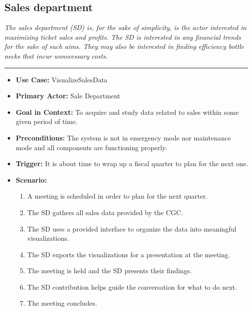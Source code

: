 \documentclass[12pt]{article}
\begin{document}
    \subsection{Sales department}
    \textit{The sales department (SD) is, for the sake of simplicity, is the actor interested 
    in maximizing ticket sales and profits. The SD is interested in any financial trends
    for the sake of such aims. They may also be interested in finding efficiency bottle necks
    that incur unnecessary costs.}
    \par\noindent\rule{\textwidth}{0.4pt}    
    \begin{itemize}
        \item[]\textbf{Use Case:}                                
            VisualizeSalesData

        \item[]\textbf{Primary Actor:}
            Sale Department

        \item[]\textbf{Goal in Context:}
            To acquire and study data related to sales within some given period of time.

        \item[]\textbf{Preconditions:}
            The system is not in emergency mode nor maintenance mode and all components are 
            functioning properly.

        \item[]\textbf{Trigger:}
            It is about time to wrap up a fiscal quarter to plan for the next one.

        \item[]\textbf{Scenario:}
            \begin{enumerate}
                \item A meeting is scheduled in order to plan for the next quarter.
                \item The SD gathers all sales data provided by the CGC.
                \item The SD uses a provided interface to organize the data into meaningful visualizations.
                \item The SD exports the visualizations for a presentation at the meeting.
                \item The meeting is held and the SD presents their findings.
                \item The SD contribution helps guide the conversation for what to do next.
                \item The meeting concludes. 
            \end{enumerate}


\end{itemize}
\end{document}
